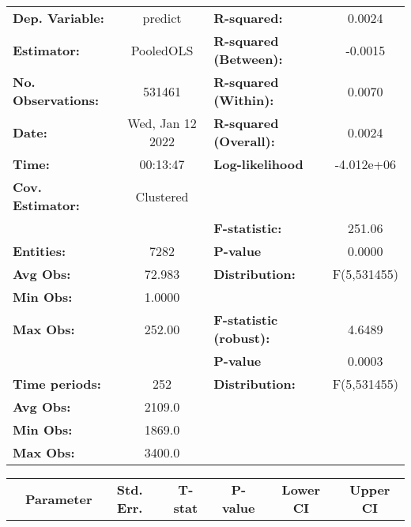 \begin{center}
\begin{tabular}{lclc}
\toprule
\textbf{Dep. Variable:}    &      predict       & \textbf{  R-squared:         }   &      0.0024      \\
\textbf{Estimator:}        &     PooledOLS      & \textbf{  R-squared (Between):}  &     -0.0015      \\
\textbf{No. Observations:} &       531461       & \textbf{  R-squared (Within):}   &      0.0070      \\
\textbf{Date:}             &  Wed, Jan 12 2022  & \textbf{  R-squared (Overall):}  &      0.0024      \\
\textbf{Time:}             &      00:13:47      & \textbf{  Log-likelihood     }   &    -4.012e+06    \\
\textbf{Cov. Estimator:}   &     Clustered      & \textbf{                     }   &                  \\
\textbf{}                  &                    & \textbf{  F-statistic:       }   &      251.06      \\
\textbf{Entities:}         &        7282        & \textbf{  P-value            }   &      0.0000      \\
\textbf{Avg Obs:}          &       72.983       & \textbf{  Distribution:      }   &   F(5,531455)    \\
\textbf{Min Obs:}          &       1.0000       & \textbf{                     }   &                  \\
\textbf{Max Obs:}          &       252.00       & \textbf{  F-statistic (robust):} &      4.6489      \\
\textbf{}                  &                    & \textbf{  P-value            }   &      0.0003      \\
\textbf{Time periods:}     &        252         & \textbf{  Distribution:      }   &   F(5,531455)    \\
\textbf{Avg Obs:}          &       2109.0       & \textbf{                     }   &                  \\
\textbf{Min Obs:}          &       1869.0       & \textbf{                     }   &                  \\
\textbf{Max Obs:}          &       3400.0       & \textbf{                     }   &                  \\
\bottomrule
\end{tabular}
\begin{tabular}{lcccccc}
                & \textbf{Parameter} & \textbf{Std. Err.} & \textbf{T-stat} & \textbf{P-value} & \textbf{Lower CI} & \textbf{Upper CI}  \\

\end{tabular}
\end{center}
